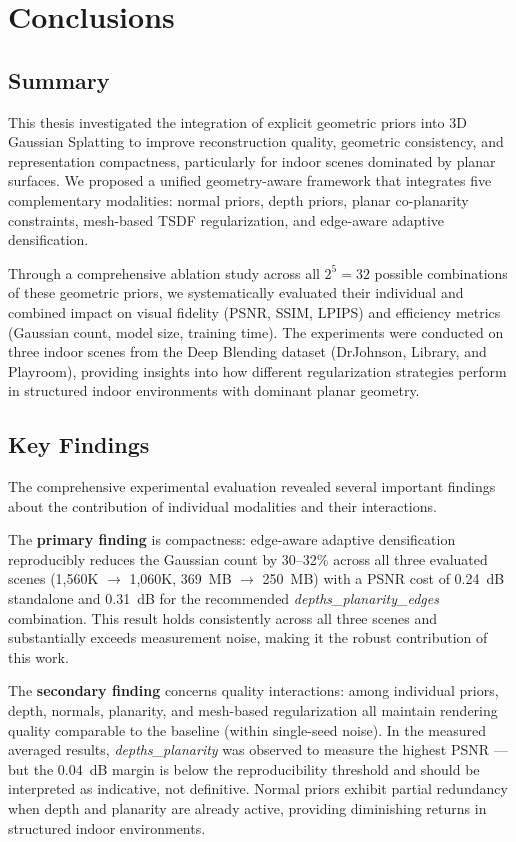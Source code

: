 \chapter{Conclusions}

\section{Summary}

This thesis investigated the integration of explicit geometric priors into 3D Gaussian Splatting to improve reconstruction quality, geometric consistency, and representation compactness, particularly for indoor scenes dominated by planar surfaces. We proposed a unified geometry-aware framework that integrates five complementary modalities: normal priors, depth priors, planar co-planarity constraints, mesh-based TSDF regularization, and edge-aware adaptive densification.

Through a comprehensive ablation study across all $2^5 = 32$ possible combinations of these geometric priors, we systematically evaluated their individual and combined impact on visual fidelity (PSNR, SSIM, LPIPS) and efficiency metrics (Gaussian count, model size, training time). The experiments were conducted on three indoor scenes from the Deep Blending dataset (DrJohnson, Library, and Playroom), providing insights into how different regularization strategies perform in structured indoor environments with dominant planar geometry.

\section{Key Findings}

The comprehensive experimental evaluation revealed several important findings about the contribution of individual modalities and their interactions.

The \textbf{primary finding} is compactness: edge-aware adaptive densification reproducibly reduces the Gaussian count by 30--32\% across all three evaluated scenes (1{,}560K $\to$ 1{,}060K, 369~MB $\to$ 250~MB) with a PSNR cost of 0.24~dB standalone and 0.31~dB for the recommended \textit{depths\_\allowbreak planarity\_\allowbreak edges} combination. This result holds consistently across all three scenes and substantially exceeds measurement noise, making it the robust contribution of this work.

The \textbf{secondary finding} concerns quality interactions: among individual priors, depth, normals, planarity, and mesh-based regularization all maintain rendering quality comparable to the baseline (within single-seed noise). In the measured averaged results, \textit{depths\_\allowbreak planarity} was observed to measure the highest PSNR — but the 0.04~dB margin is below the reproducibility threshold and should be interpreted as indicative, not definitive. Normal priors exhibit partial redundancy when depth and planarity are already active, providing diminishing returns in structured indoor environments.

